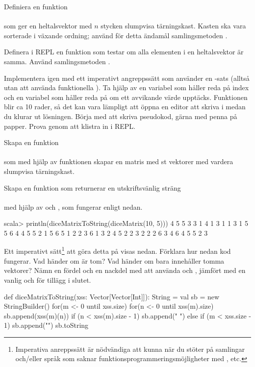 \Subtask Definiera en funktion \\ \\ som ger en heltalsvektor med $n$ stycken slumpvisa tärningskast. Kasten ska vara sorterade i växande ordning; använd för detta ändamål samlingsmetoden .



\Subtask Definera i REPL en funktion  som testar om alla elementen i en heltalsvektor är samma. Använd samlingsmetoden .


\Subtask Implementera  igen med ett imperativt angreppssätt som använder en -sats (alltså utan att använda funktionella  ). Ta hjälp av en variabel  som håller reda på index och en variabel  som håller reda på om ett avvikande värde upptäcks. Funktionen blir ca 10 rader, så det kan vara lämpligt att öppna en editor att skriva i medan du klurar ut lösningen. Börja med att skriva pseudokod, gärna med penna på papper. Prova genom att klistra in i REPL.



\Subtask Skapa en funktion  \\  \\ som med hjälp av funktionen  skapar en matris med  st vektorer med vardera  slumpvisa tärningskast.


\Subtask Skapa en funktion som returnerar en utskriftsvänlig sträng \\  \\med hjälp av  och , som fungerar enligt nedan.
\begin{REPL}
scala> println(diceMatrixToString(diceMatrix(10, 5)))
4 5 5 3 3
1 4 1 3 1
1 3 1 5 5
6 4 4 5 5
2 1 5 6 5
1 2 2 3 6
1 3 2 4 5
2 2 3 2 2
2 6 3 4 6
4 5 5 2 3

\end{REPL}



\Subtask\Pen Ett imperativt sätt\footnote{Imperativa anreppssätt är nödvändiga att kunna när du stöter på samlingar och/eller språk som saknar funktionsprogrammeringsmöjligheter med ,  etc.} att göra detta på visas nedan. Förklara hur nedan kod fungerar. Vad händer om  är tom? Vad händer om  bara innehåller tomma vektorer? Nämn en fördel och en nackdel med att använda  och , jämfört med en vanlig  och \code{+} för tillägg i slutet.
\begin{Code}
def diceMatrixToString(xss: Vector[Vector[Int]]): String = {
  val sb = new StringBuilder()
  for(m <- 0 until xss.size) {
    for(n <- 0 until xss(m).size) {
      sb.append(xss(m)(n))
      if (n < xss(m).size - 1) sb.append(" ")
      else if (m < xss.size - 1) sb.append("\n")
    }
  }
  sb.toString
}
\end{Code}

